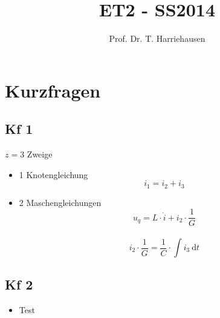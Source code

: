 \documentclass[10pt,a4paper]{article}
\title{ET2 - SS2014}
\author{Prof. Dr. T. Harriehausen}
\begin{document}
\section*{Kurzfragen}
\subsection*{Kf 1} 
$z=3$ Zweige
\renewcommand{\labelitemi}{$\rightarrow$}
\begin{itemize}
\item 	1 Knotengleichung \\
			\[i_1=i_2+i_3\]
\item 	2 Maschengleichungen \\
			\[u_q=L \cdot \dot{i}+i_2 \cdot \frac{1}{G}\] \\
			\[i_2 \cdot \frac{1}{G}=\frac{1}{C} \cdot \int \! i_3 ~\mathrm{d}t\]
\end{itemize}
\subsection*{Kf 2}
\begin{itemize}
\item Test
\end{itemize}
\end{document}
